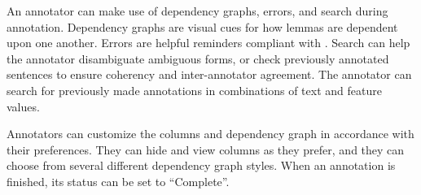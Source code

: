 An annotator can make use of dependency graphs, errors, and search during annotation.
Dependency graphs are visual cues for how lemmas are dependent upon one another.
Errors are helpful reminders compliant with \ud. Search can help the annotator disambiguate ambiguous forms, or check previously annotated sentences to ensure coherency and inter-annotator agreement. The annotator can search for previously made annotations in combinations of text and feature values.

Annotators can customize the columns and dependency graph in accordance with their preferences. They can hide and view columns as they prefer, and they can choose from several different dependency graph styles.
When an annotation is finished, its status can be set to ``Complete''.

